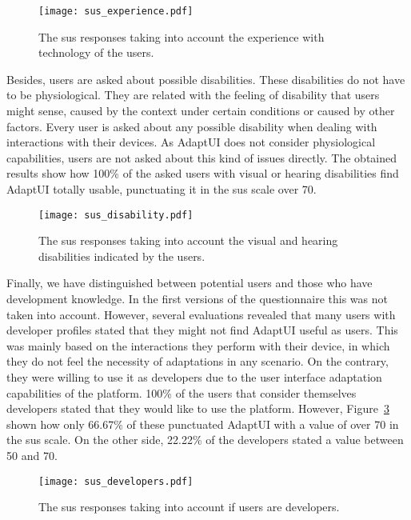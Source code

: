 \begin{figure}
\centering
\texttt{[image: sus\_experience.pdf]}
\caption{The \ac{sus} responses taking into account the experience with technology
of the users.}
\label{fig:sus_experience}
\end{figure}

Besides, users are asked about possible disabilities. These disabilities do not
have to be physiological. They are related with the feeling of disability that
users might sense, caused by the context under certain conditions or caused by
other factors. Every user is asked about any possible disability when dealing
with interactions with their devices. As AdaptUI does not consider physiological
capabilities, users are not asked about this kind of issues directly. The
obtained results show how 100\% of the asked users with visual or hearing
disabilities find AdaptUI totally usable, punctuating it in the \ac{sus} scale over
70.

\begin{figure}
\centering
\texttt{[image: sus\_disability.pdf]}
\caption{The \ac{sus} responses taking into account the visual and hearing 
disabilities
indicated by the users.}
\label{fig:sus_disability}
\end{figure}

Finally, we have distinguished between potential users and those who have
development knowledge. In the first versions of the questionnaire this was not
taken into account. However, several evaluations revealed that many users with 
developer profiles stated that they might not find AdaptUI useful as users. This
was mainly based on the interactions they perform with their device, in which they
do not feel the necessity of adaptations in any scenario. On the contrary, they 
were willing to use it as developers due to the user 
interface adaptation capabilities of the platform. 100\% of the users that 
consider themselves developers stated that they would like to use the platform. 
However, Figure~\ref{fig:sus_developers} shown how only 66.67\% of these 
punctuated AdaptUI with a value of over 70 in the \ac{sus} scale. On the other 
side, 22.22\% of the developers stated a value between 50 and 70.

\begin{figure}
\centering
\texttt{[image: sus\_developers.pdf]}
\caption{The \ac{sus} responses taking into account if users are developers.}
\label{fig:sus_developers}
\end{figure}


